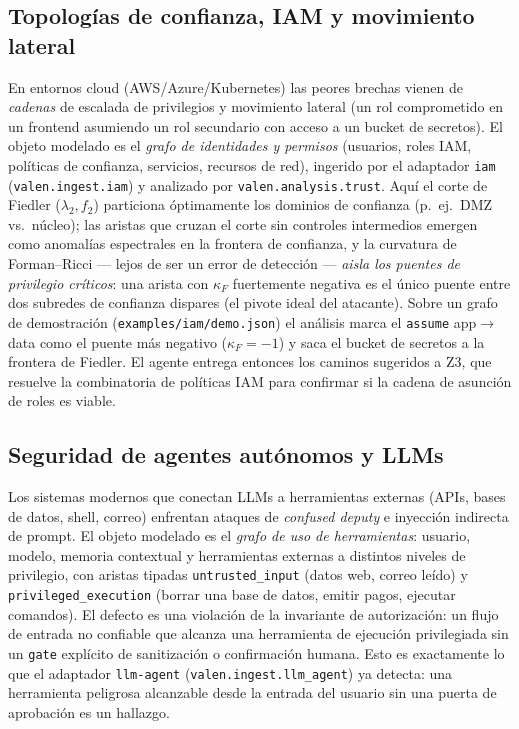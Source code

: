 \documentclass[11pt]{article}
\begin{document}
\subsection{Topologías de confianza, IAM y movimiento lateral}
En entornos cloud (AWS/Azure/Kubernetes) las peores brechas vienen de
\emph{cadenas} de escalada de privilegios y movimiento lateral (un rol
comprometido en un frontend asumiendo un rol secundario con acceso a un bucket de
secretos). El objeto modelado es el \emph{grafo de identidades y permisos}
(usuarios, roles IAM, políticas de confianza, servicios, recursos de red),
ingerido por el adaptador \texttt{iam} (\texttt{valen.ingest.iam}) y analizado
por \texttt{valen.analysis.trust}. Aquí
el corte de Fiedler ($\lambda_2, f_2$) particiona óptimamente los dominios de
confianza (p.~ej.\ DMZ vs.\ núcleo); las aristas que cruzan el corte sin
controles intermedios emergen como anomalías espectrales en la frontera de
confianza, y la curvatura de Forman--Ricci --- lejos de ser un error de
detección --- \emph{aisla los puentes de privilegio críticos}: una arista con
$\kappa_F$ fuertemente negativa es el único puente
entre dos subredes de confianza dispares (el pivote ideal del atacante). Sobre un
grafo de demostración (\texttt{examples/iam/demo.json}) el análisis marca el
\texttt{assume} app$\to$data como el puente más negativo ($\kappa_F=-1$) y saca
el bucket de secretos a la frontera de Fiedler. El
agente entrega entonces los caminos sugeridos a Z3, que resuelve la combinatoria
de políticas IAM para confirmar si la cadena de asunción de roles es viable.

\subsection{Seguridad de agentes autónomos y LLMs}
Los sistemas modernos que conectan LLMs a herramientas externas (APIs, bases de
datos, shell, correo) enfrentan ataques de \emph{confused deputy} e inyección
indirecta de prompt. El objeto modelado es el \emph{grafo de uso de
herramientas}: usuario, modelo, memoria contextual y herramientas externas a
distintos niveles de privilegio, con aristas tipadas \texttt{untrusted\_input}
(datos web, correo leído) y \texttt{privileged\_execution} (borrar una base de
datos, emitir pagos, ejecutar comandos). El defecto es una violación de la
invariante de autorización: un flujo de entrada no confiable que alcanza una
herramienta de ejecución privilegiada sin un \texttt{gate} explícito de
sanitización o confirmación humana. Esto es exactamente lo que el adaptador
\texttt{llm-agent} (\texttt{valen.ingest.llm\_agent}) ya detecta: una
herramienta peligrosa alcanzable desde la entrada del usuario sin una puerta de
aprobación es un hallazgo.
\end{document}
